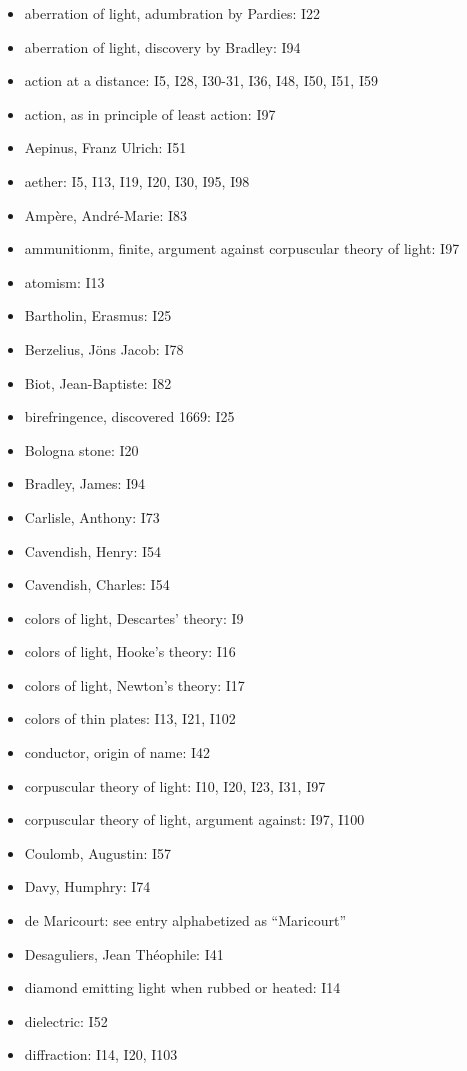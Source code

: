 \documentclass[a4paper]{article}
\theoremstyle{plain}
\theoremstyle{definition}
\begin{document}
\begin{itemize}
\item aberration of light, adumbration by Pardies: I22
\item aberration of light, discovery by Bradley: I94
\item action at a distance: I5, I28, I30-31, I36, I48, I50, I51, I59
\item action, as in principle of least action: I97
\item Aepinus, Franz Ulrich: I51
\item aether: I5, I13, I19, I20, I30, I95, I98
\item Amp\`{e}re, Andr\'{e}-Marie: I83
\item ammunitionm, finite, argument against corpuscular theory of light: I97
\item atomism: I13
\item Bartholin, Erasmus: I25
\item Berzelius, J\"{o}ns Jacob: I78
\item Biot, Jean-Baptiste: I82
\item birefringence, discovered 1669: I25
\item Bologna stone: I20
\item Bradley, James: I94
\item Carlisle, Anthony: I73
\item Cavendish, Henry: I54
\item Cavendish, Charles: I54
\item colors of light, Descartes' theory: I9
\item colors of light, Hooke's theory: I16
\item colors of light, Newton's theory: I17
\item colors of thin plates: I13, I21, I102
\item conductor, origin of name: I42
\item corpuscular theory of light: I10, I20, I23, I31, I97
\item corpuscular theory of light, argument against: I97, I100
\item Coulomb, Augustin: I57
\item Davy, Humphry: I74
\item de Maricourt: see entry alphabetized as ``Maricourt''
\item Desaguliers, Jean Th\'{e}ophile: I41
\item diamond emitting light when rubbed or heated: I14
\item dielectric: I52
\item diffraction: I14, I20, I103

\end{itemize}
\end{document}
